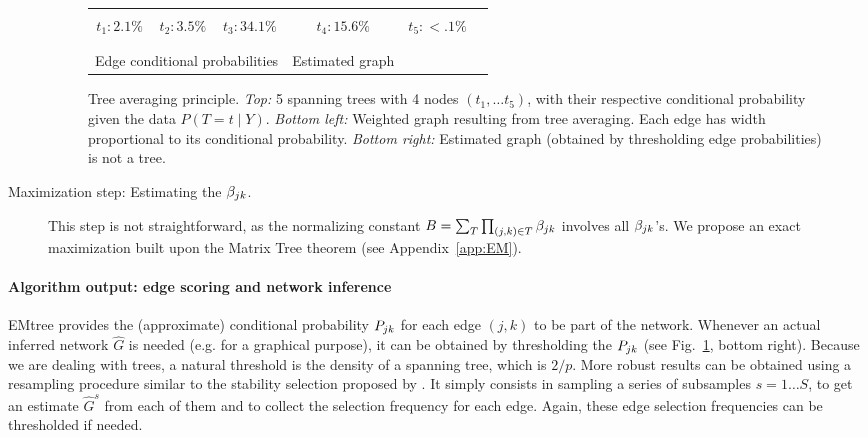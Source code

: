 \begin{description}
\begin{figure}[H]
   \begin{center}
    \begin{tabular}{cccccc}
         &
         &
         &
         &
         \\
        $t_1: 2.1\%$ & 
        $t_2: 3.5\%$ & 
        $t_3: 34.1\%$ & 
        $t_4: 15.6\%$ & 
        $t_5:  <.1\%$ \\ \\
        & 
         &
        \qquad \qquad &
         \\
        \multicolumn{3}{c}{Edge conditional probabilities} & Estimated graph \\
    \end{tabular}
    \caption{Tree averaging principle. 
    \textit{Top:} 5 spanning trees with 4 nodes  $(t_1, \dots t_5)$, with their respective conditional probability given the data $P(T = t \mid Y)$.
    \textit{Bottom left:} Weighted graph resulting from tree averaging. Each edge  has width proportional to its conditional probability. \textit{ Bottom right:} Estimated graph (obtained by thresholding edge probabilities) is not a tree.}
    \label{fig:treeaveraging}
   \end{center}
\end{figure}

\item[Maximization step: Estimating the $\beta_{jk}$.] 
This step is not straightforward, as the normalizing constant $B = \sum_T \prod_{(j, k) \in T} \beta_{jk}$ involves all $\beta_{jk}$'s. We propose an exact maximization built upon the Matrix Tree theorem (see Appendix~\ref{app:EM}). 
\end{description}


\paragraph{Algorithm output: edge scoring and network inference} 
EMtree provides the (approximate) conditional probability $P_{jk}$ for each edge $(j, k)$ to be part of the network. 
Whenever an actual inferred network $\widehat{G}$ is needed (e.g. for a graphical purpose), it can be obtained by thresholding the $P_{jk}$ (see Fig.~\ref{fig:treeaveraging}, bottom right). Because we are dealing with trees, a natural threshold is the density of a spanning tree, which is  $2/p$.
More robust results can be obtained using a resampling procedure similar to the stability selection proposed by \citet{LRW10}. It simply consists in sampling a series of subsamples $s = 1 \dots S$, to get an estimate $\widehat{G}^s$ from each of them and to collect the selection frequency for each edge. Again, these edge selection frequencies can be thresholded if needed.